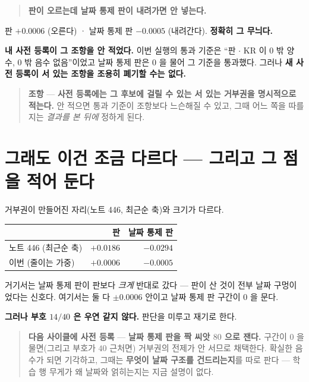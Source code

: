\documentclass[11pt]{article}
\begin{document}
\begin{quote}
\textbf{판이 오르는데 날짜 통제 판이 내려가면 안 넣는다.}
\end{quote}

판 $+0.0006$ (오른다) · 날짜 통제 판 $-0.0005$ (내려간다). \textbf{정확히
그 무늬다.}

\textbf{내 사전 등록이 그 조항을 안 적었다.} 이번 실행의 통과 기준은
``판 $\cdot$ KR 이 $0$ 밖 양수, $0$ 밖 음수 없음''이었고 날짜 통제 판은
$0$ 을 물어 그 기준을 통과했다. 그러나 \textbf{새 사전 등록이 서 있는
조항을 조용히 폐기할 수는 없다.}

\begin{quote}
\textbf{조항} --- \textbf{사전 등록에는 그 후보에 걸릴 수 있는 서 있는
거부권을 명시적으로 적는다.} 안 적으면 통과 기준이 조항보다 느슨해질 수
있고, 그때 어느 쪽을 따를지는 \emph{결과를 본 뒤에} 정하게 된다.
\end{quote}

\section{그래도 이건 조금 다르다 --- 그리고 그 점을 적어 둔다}

거부권이 만들어진 자리(노트 446, 최근순 축)와 크기가 다르다.

\begin{center}
\begin{tabular}{lrr}
\hline
& 판 & 날짜 통제 판 \\
\hline
노트 446 (최근순 축) & $+0.0186$ & $\mathbf{-0.0294}$ \\
이번 (줄이는 가중) & $+0.0006$ & $-0.0005$ \\
\hline
\end{tabular}
\end{center}

거기서는 날짜 통제 판이 판보다 \emph{크게} 반대로 갔다 --- 판이 산 것이
전부 날짜 구멍이었다는 신호다. 여기서는 둘 다 $\pm 0.0006$ 안이고 날짜
통제 판 구간이 $0$ 을 문다.

\textbf{그러나 부호 $14/40$ 은 우연 같지 않다.} 판단을 미루고 재기로 한다.

\begin{quote}
\textbf{다음 사이클에 사전 등록} --- \textbf{날짜 통제 판을 짝 씨앗
$80$ 으로 잰다.} 구간이 $0$ 을 물면(그리고 부호가 $40$ 근처면) 거부권의
전제가 안 서므로 채택한다. 확실한 음수가 되면 기각하고, 그때는
\textbf{무엇이 날짜 구조를 건드리는지}를 따로 판다 --- 학습 행 무게가
왜 날짜와 얽히는지는 지금 설명이 없다.
\end{quote}
\end{document}

